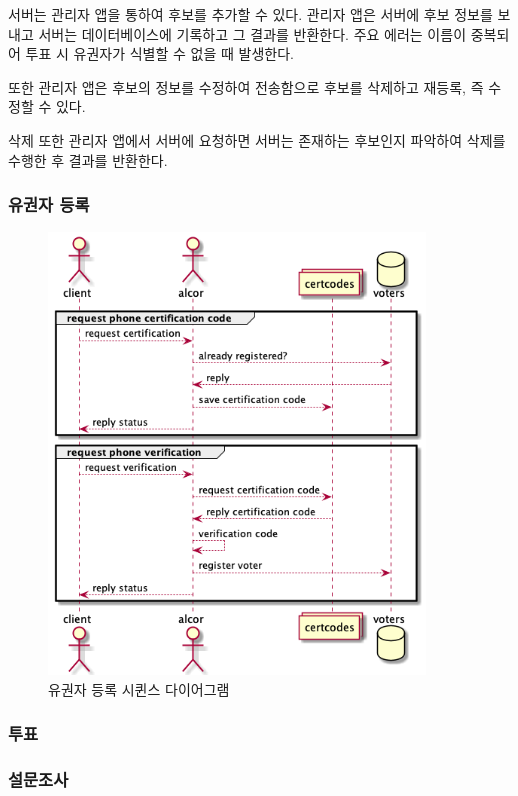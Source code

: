 \documentclass[11pt,a4paper,left=15mm,right=15mm,top=20mm,bottom=20mm]{article}
\begin{document}
        서버는 관리자 앱을 통하여 후보를 추가할 수 있다. 관리자 앱은 서버에 후보 정보를 보내고 서버는 데이터베이스에 기록하고 그 결과를 반환한다. 주요 에러는 이름이 중복되어 투표 시 유권자가 식별할 수 없을 때 발생한다. 

        또한 관리자 앱은 후보의 정보를 수정하여 전송함으로 후보를 삭제하고 재등록, 즉 수정할 수 있다.

        삭제 또한 관리자 앱에서 서버에 요청하면 서버는 존재하는 후보인지 파악하여 삭제를 수행한 후 결과를 반환한다.

        \subsubsection{유권자 등록}

        \begin{figure}[h]
            \begin{center}
                \includegraphics[width=10cm]{client-register}
                \caption{유권자 등록 시퀸스 다이어그램}
            \end{center}
        \end{figure}

        

        \subsubsection{투표}

        \subsubsection{설문조사}
\end{document}
